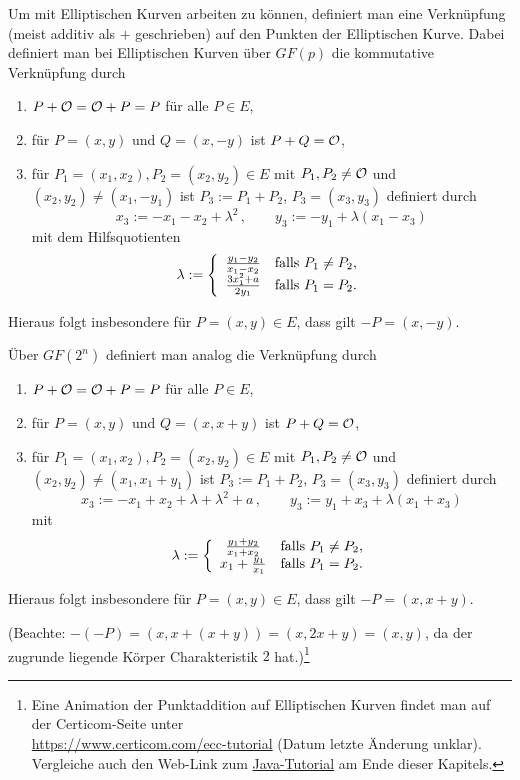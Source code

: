 \begin{refsegment}
Um mit Elliptischen Kurven arbeiten zu können, definiert man eine Verknüpfung (meist additiv als $+$ geschrieben) auf den Punkten der Elliptischen Kurve. Dabei definiert man bei Elliptischen Kurven über $GF(p)$ die kommutative Verknüpfung durch
\begin{enumerate}
\item $P+{\cal O}={\cal O}+P=P$ für alle $P\in E$,
\item für $P=(x,y)$ und $Q=(x,-y)$ ist $P+Q={\cal O}$,
\item für $P_1=(x_1,x_2),P_2=(x_2,y_2)\in E$ mit $P_1,P_2\ne {\cal O}$ und $(x_2,y_2)\ne (x_1,-y_1)$ ist $P_3:=P_1+P_2$, $P_3=(x_3,y_3)$ definiert durch
$$ x_3:=-x_1-x_2+\lambda^2 \, , \qquad y_3:=-y_1+\lambda (x_1-x_3)
$$
mit dem Hilfsquotienten
$$ \lambda:=\left\{ \begin{array}{cl} \frac{y_1-y_2}{x_1-x_2} & {\rm falls~} P_1\ne P_2,\\
                                     \frac{3x_1^2+a}{2y_1} & {\rm falls~} P_1=P_2. \end{array} \right.
$$
\end{enumerate}
Hieraus folgt insbesondere für $P=(x,y)\in E$, dass gilt $-P=(x,-y)$.

Über $GF(2^n)$ definiert man analog die Verknüpfung durch
\begin{enumerate}
\item $P+{\cal O}={\cal O}+P=P$ für alle $P\in E$,
\item für $P=(x,y)$ und $Q=(x,x+y)$ ist $P+Q={\cal O}$,
\item für $P_1=(x_1,x_2),P_2=(x_2,y_2)\in E$ mit $P_1,P_2\ne {\cal O}$ und $(x_2,y_2)\ne (x_1,x_1+y_1)$ ist $P_3:=P_1+P_2$, $P_3=(x_3,y_3)$ definiert durch
$$ x_3:=-x_1+x_2+\lambda+\lambda^2+a \, , \qquad y_3:=y_1+x_3+\lambda (x_1+x_3)
$$
mit
$$ \lambda:=\left\{ \begin{array}{cl} \frac{y_1+y_2}{x_1+x_2} & {\rm falls~} P_1\ne P_2,\\
                                   x_1+\frac{y_1}{x_1} & {\rm falls~} P_1=P_2. \end{array}\right.
$$
\end{enumerate}
Hieraus folgt insbesondere für $P=(x,y)\in E$, dass gilt $-P=(x,x+y)$.

(Beachte: $-(-P)=(x,x+(x+y))=(x,2x+y)=(x,y)$, da der zugrunde liegende Körper Charakteristik $2$ hat.)\footnote{%
Eine Animation der Punktaddition auf Elliptischen Kurven
findet man auf der Certicom-Seite unter\\
\url{https://www.certicom.com/ecc-tutorial} (Datum letzte Änderung unklar).\\
Vergleiche auch den Web-Link zum \hyperlink{ec:Web-Link:Java_Laubrock}
{Java-Tutorial} am Ende dieser Kapitels.

}
\end{refsegment}
